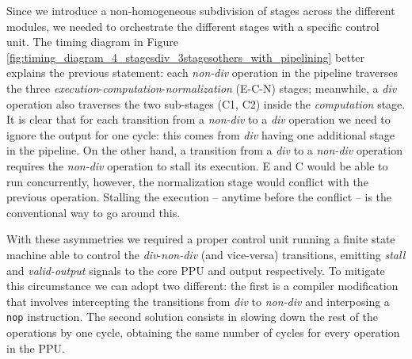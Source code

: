 Since we introduce a non-homogeneous subdivision of stages across the different modules, we needed to orchestrate the different stages with a specific control unit.
The timing diagram in Figure \ref{fig:timing_diagram_4_stagesdiv_3stagesothers_with_pipelining}  better explains the previous statement: each \textit{non-div} operation in the pipeline traverses  the three \textit{execution}-\textit{computation}-\textit{normalization} (E-C-N) stages; meanwhile, a  \textit{div} operation also traverses the two sub-stages (C1, C2) inside the \textit{computation} stage.
It is clear that for each transition from a \textit{non-div} to a \textit{div} operation we need to ignore the output for one cycle: this comes from \textit{div} having one additional stage in the pipeline.
On the other hand, a transition from a \textit{div} to a  \textit{non-div} operation requires the \textit{non-div} operation to stall its execution. E and C would be able to run concurrently, however, the normalization stage would conflict with the previous operation. Stalling the execution -- anytime before the conflict -- is the conventional way to go around this.

With these asymmetries we required a proper control unit running a finite state machine able to control the \textit{div}-\textit{non-div} (and vice-versa) transitions, emitting \textit{stall} and \textit{valid-output} signals to the core PPU and output respectively.
To mitigate this circumstance we can adopt two different: the first is a compiler modification that involves intercepting the transitions from \textit{div} to \textit{non-div} and interposing a \texttt{nop} instruction.
The second solution consists in slowing down the rest of the operations by one cycle, obtaining the same number of cycles for every operation in the PPU.


